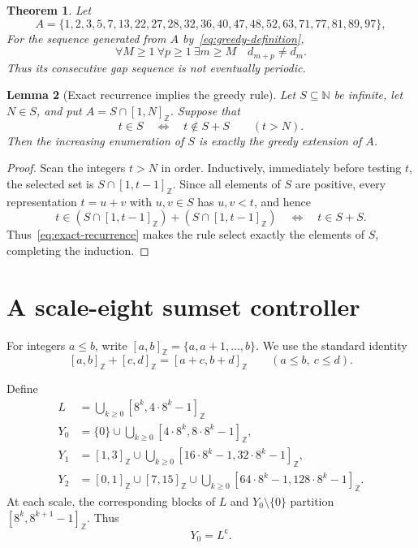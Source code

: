 \documentclass[11pt,letterpaper]{article}
\newtheorem{theorem}{Theorem}[section]
\newtheorem{lemma}[theorem]{Lemma}
\newcommand{\N}{\mathbb{N}}
\newcommand{\cpl}[1]{#1^{\mathsf{c}}}
\newcommand{\ints}[2]{[#1,#2]_{\mathbb{Z}}}
\begin{document}
\begin{theorem}\label{thm:main}
Let
\[
A=\{1,2,3,5,7,13,22,27,28,32,36,40,47,48,52,63,71,77,81,89,97\},
\]
For the sequence generated from \(A\) by~\eqref{eq:greedy-definition},
\[
\forall M\geq1\ \forall p\geq1\ \exists m\geq M
\quad d_{m+p}\neq d_m.
\]
Thus its consecutive gap sequence is not eventually periodic.
\end{theorem}

\begin{lemma}[Exact recurrence implies the greedy rule]\label{lem:greedy}
Let \(S\subseteq\N\) be infinite, let \(N\in S\), and put \(A=S\cap\ints{1}{N}\). Suppose that
\begin{equation}\label{eq:exact-recurrence}
t\in S
\quad\Longleftrightarrow\quad
t\notin S+S
\qquad (t>N).
\end{equation}
Then the increasing enumeration of \(S\) is exactly the greedy extension of \(A\).
\end{lemma}

\begin{proof}
Scan the integers \(t>N\) in order. Inductively, immediately before testing \(t\), the selected set is \(S\cap\ints{1}{t-1}\). Since all elements of \(S\) are positive, every representation \(t=u+v\) with \(u,v\in S\) has \(u,v<t\), and hence
\[
t\in(S\cap\ints{1}{t-1})+(S\cap\ints{1}{t-1})
\quad\Longleftrightarrow\quad t\in S+S.
\]
Thus~\eqref{eq:exact-recurrence} makes the rule select exactly the elements of \(S\), completing the induction.
\end{proof}

\section{A scale-eight sumset controller}

For integers \(a\leq b\), write \(\ints{a}{b}=\{a,a+1,\ldots,b\}\). We use the standard identity
\begin{equation}\label{eq:interval-sum}
\ints{a}{b}+\ints{c}{d}=\ints{a+c}{b+d}
\qquad (a\leq b,\ c\leq d).
\end{equation}

Define
\begin{align}
L&=\bigcup_{k\geq0}\ints{8^k}{4\cdot8^k-1} \\
Y_0&=\{0\}\cup
      \bigcup_{k\geq0}\ints{4\cdot8^k}{8\cdot8^k-1},
      \label{eq:Y0}\\
Y_1&=\ints{1}{3}\cup
      \bigcup_{k\geq0}\ints{16\cdot8^k-1}{32\cdot8^k-1},
      \label{eq:Y1}\\
Y_2&=\ints{0}{1}\cup\ints{7}{15}\cup
      \bigcup_{k\geq0}\ints{64\cdot8^k-1}{128\cdot8^k-1}.
      \label{eq:Y2}
\end{align}
At each scale, the corresponding blocks of \(L\) and \(Y_0\setminus\{0\}\) partition \(\ints{8^k}{8^{k+1}-1}\). Thus
\begin{equation}\label{eq:Y0-complement-L}
Y_0=\cpl{L}.
\end{equation}
\end{document}
